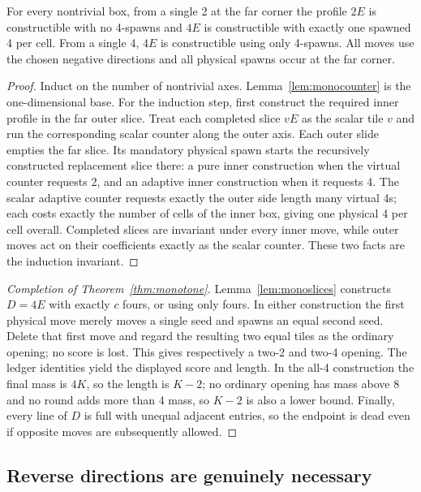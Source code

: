 \begin{lemma}\label{lem:monoslices}
For every nontrivial box, from a single 2 at the far corner the profile
$2E$ is constructible with no 4-spawns and $4E$ is constructible with
exactly one spawned 4 per cell.  From a single 4, $4E$ is constructible
using only 4-spawns.  All moves use the chosen negative directions and
all physical spawns occur at the far corner.
\end{lemma}
\begin{proof}
Induct on the number of nontrivial axes.  Lemma~\ref{lem:monocounter} is
the one-dimensional base.  For the induction step, first construct the
required inner profile in the far outer slice.  Treat each completed
slice $vE$ as the scalar tile $v$ and run the corresponding scalar counter
along the outer axis.  Each outer slide empties the far slice.  Its
mandatory physical spawn starts the recursively constructed replacement
slice there: a pure inner construction when the virtual counter requests
2, and an adaptive inner construction when it requests 4.  The scalar
adaptive counter requests exactly the outer side length many virtual 4s;
each costs exactly the number of cells of the inner box, giving one
physical 4 per cell overall.  Completed slices are invariant under every
inner move, while outer moves act on their coefficients exactly as the
scalar counter.  These two facts are the induction invariant.
\end{proof}

\begin{proof}[Completion of Theorem~\ref{thm:monotone}]
Lemma~\ref{lem:monoslices} constructs $D=4E$ with exactly $c$ fours, or
using only fours.  In either construction the first physical move merely
moves a single seed and spawns an equal second seed.  Delete that first
move and regard the resulting two equal tiles as the ordinary opening;
no score is lost.  This gives respectively a two-2 and two-4 opening.
The ledger identities yield the displayed score and length.  In the
all-4 construction the final mass is $4K$, so the length is $K-2$; no
ordinary opening has mass above 8 and no round adds more than 4 mass, so
$K-2$ is also a lower bound.  Finally, every line of $D$ is full with
unequal adjacent entries, so the endpoint is dead even if opposite
moves are subsequently allowed.
\end{proof}

\subsection{Reverse directions are genuinely necessary}


